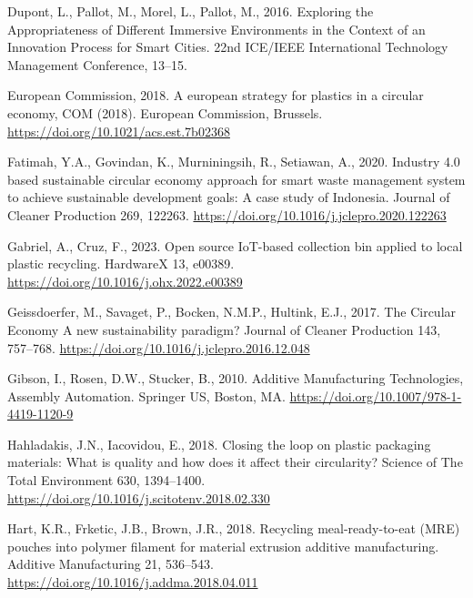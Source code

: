 \documentclass[
  11pt,
]{article}
\newlength{\cslhangindent}
\newlength{\cslentryspacingunit} %
\newenvironment{CSLReferences}[2] %
 {%
  \setlength{\parindent}{0pt}
  \ifodd #1
  \let\oldpar\par
  \def\par{\hangindent=\cslhangindent\oldpar}
  \fi
  \setlength{\parskip}{#2\cslentryspacingunit}
 }%
 {}
\begin{document}
\begin{CSLReferences}{1}{0}
\leavevmode{}%
Dupont, L., Pallot, M., Morel, L., Pallot, M., 2016. Exploring the
{Appropriateness} of {Different Immersive Environments} in the {Context}
of an {Innovation Process} for {Smart Cities}. 22nd ICE/IEEE
International Technology Management Conference, 13--15.

\leavevmode{}%
European Commission, 2018. A european strategy for plastics in a
circular economy, COM (2018). {European Commission}, {Brussels}.
\url{https://doi.org/10.1021/acs.est.7b02368}

\leavevmode{}%
Fatimah, Y.A., Govindan, K., Murniningsih, R., Setiawan, A., 2020.
Industry 4.0 based sustainable circular economy approach for smart waste
management system to achieve sustainable development goals: {A} case
study of {Indonesia}. Journal of Cleaner Production 269, 122263.
\url{https://doi.org/10.1016/j.jclepro.2020.122263}

\leavevmode{}%
Gabriel, A., Cruz, F., 2023. Open source {IoT-based} collection bin
applied to local plastic recycling. HardwareX 13, e00389.
\url{https://doi.org/10.1016/j.ohx.2022.e00389}

\leavevmode{}%
Geissdoerfer, M., Savaget, P., Bocken, N.M.P., Hultink, E.J., 2017. The
{Circular Economy} \textendash{} {A} new sustainability paradigm?
Journal of Cleaner Production 143, 757--768.
\url{https://doi.org/10.1016/j.jclepro.2016.12.048}

\leavevmode{}%
Gibson, I., Rosen, D.W., Stucker, B., 2010. Additive {Manufacturing
Technologies}, Assembly Automation. {Springer US}, {Boston, MA}.
\url{https://doi.org/10.1007/978-1-4419-1120-9}

\leavevmode{}%
Hahladakis, J.N., Iacovidou, E., 2018. Closing the loop on plastic
packaging materials: {What} is quality and how does it affect their
circularity? Science of The Total Environment 630, 1394--1400.
\url{https://doi.org/10.1016/j.scitotenv.2018.02.330}

\leavevmode{}%
Hart, K.R., Frketic, J.B., Brown, J.R., 2018. Recycling
meal-ready-to-eat ({MRE}) pouches into polymer filament for material
extrusion additive manufacturing. Additive Manufacturing 21, 536--543.
\url{https://doi.org/10.1016/j.addma.2018.04.011}


\end{CSLReferences}
\end{document}
